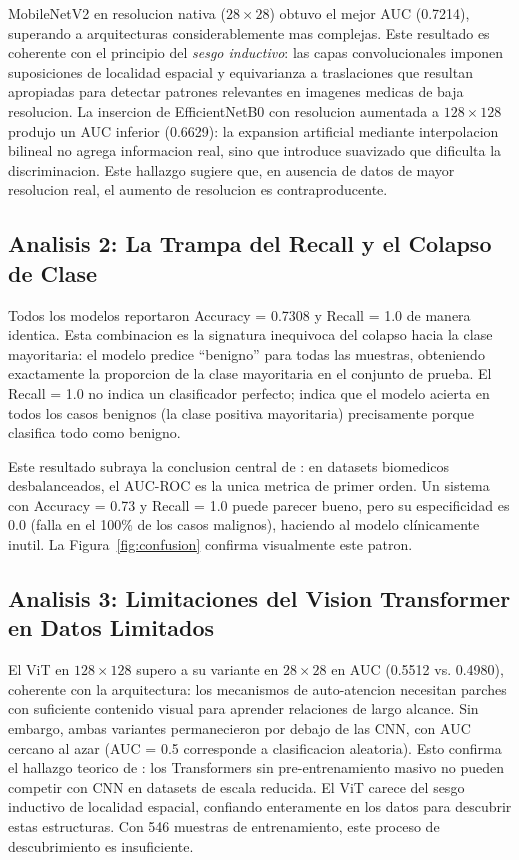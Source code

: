 \documentclass[12pt, a4paper]{article}
\begin{document}
MobileNetV2 en resolucion nativa ($28\times28$) obtuvo el mejor AUC (0.7214), superando a arquitecturas considerablemente mas complejas. Este resultado es coherente con el principio del \textit{sesgo inductivo}: las capas convolucionales imponen suposiciones de localidad espacial y equivarianza a traslaciones que resultan apropiadas para detectar patrones relevantes en imagenes medicas de baja resolucion. La insercion de EfficientNetB0 con resolucion aumentada a $128\times128$ produjo un AUC inferior (0.6629): la expansion artificial mediante interpolacion bilineal no agrega informacion real, sino que introduce suavizado que dificulta la discriminacion. Este hallazgo sugiere que, en ausencia de datos de mayor resolucion real, el aumento de resolucion es contraproducente.

\subsection{Analisis 2: La Trampa del Recall y el Colapso de Clase}

Todos los modelos reportaron Accuracy = 0.7308 y Recall = 1.0 de manera identica. Esta combinacion es la signatura inequivoca del colapso hacia la clase mayoritaria: el modelo predice ``benigno'' para todas las muestras, obteniendo exactamente la proporcion de la clase mayoritaria en el conjunto de prueba. El Recall = 1.0 no indica un clasificador perfecto; indica que el modelo acierta en todos los casos benignos (la clase positiva mayoritaria) precisamente porque clasifica todo como benigno.

Este resultado subraya la conclusion central de \citet{yang2023medmnist}: en datasets biomedicos desbalanceados, el AUC-ROC es la unica metrica de primer orden. Un sistema con Accuracy = 0.73 y Recall = 1.0 puede parecer bueno, pero su especificidad es 0.0 (falla en el 100\% de los casos malignos), haciendo al modelo clínicamente inutil. La Figura~\ref{fig:confusion} confirma visualmente este patron.

\subsection{Analisis 3: Limitaciones del Vision Transformer en Datos Limitados}

El ViT en $128\times128$ supero a su variante en $28\times28$ en AUC (0.5512 vs. 0.4980), coherente con la arquitectura: los mecanismos de auto-atencion necesitan parches con suficiente contenido visual para aprender relaciones de largo alcance. Sin embargo, ambas variantes permanecieron por debajo de las CNN, con AUC cercano al azar (AUC = 0.5 corresponde a clasificacion aleatoria). Esto confirma el hallazgo teorico de \citet{dosovitskiy2021vit}: los Transformers sin pre-entrenamiento masivo no pueden competir con CNN en datasets de escala reducida. El ViT carece del sesgo inductivo de localidad espacial, confiando enteramente en los datos para descubrir estas estructuras. Con 546 muestras de entrenamiento, este proceso de descubrimiento es insuficiente.
\end{document}
